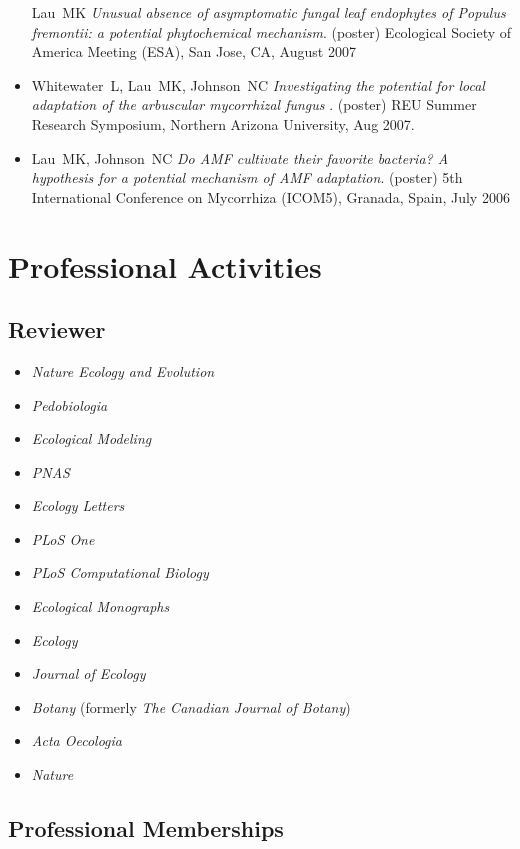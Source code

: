 \documentclass[a4paper]{article}
\begin{document}
\begin{itemize}
  Lau~MK \emph{Unusual absence of asymptomatic fungal leaf endophytes of
  Populus fremontii: a potential phytochemical mechanism}. (poster)
  Ecological Society of America Meeting (ESA), San Jose, CA, August 2007
\item
  Whitewater~L, Lau~MK, Johnson~NC \emph{Investigating the potential for
  local adaptation of the arbuscular mycorrhizal fungus} . (poster) REU
  Summer Research Symposium, Northern Arizona University, Aug 2007.
\item
  Lau~MK, Johnson~NC \emph{Do AMF cultivate their favorite bacteria? A
  hypothesis for a potential mechanism of AMF adaptation}. (poster) 5th
  International Conference on Mycorrhiza (ICOM5), Granada, Spain, July
  2006

\end{itemize}

\section{Professional Activities}\label{professional-activities}

\subsection{Reviewer}\label{article-reviewer}

\begin{itemize}
\item
  \emph{Nature Ecology and Evolution}
\item
  \emph{Pedobiologia}
\item
  \emph{Ecological Modeling}
\item
  \emph{PNAS}
\item
  \emph{Ecology Letters}
\item
  \emph{PLoS One}
\item
  \emph{PLoS Computational Biology}
\item
  \emph{Ecological Monographs}
\item
  \emph{Ecology}
\item
  \emph{Journal of Ecology}
\item
  \emph{Botany} (formerly \emph{The Canadian Journal of Botany})
\item
  \emph{Acta Oecologia}
\item
  \emph{Nature}
\end{itemize}

\subsection{Professional Memberships}\label{professional-memberships}
\end{document}
